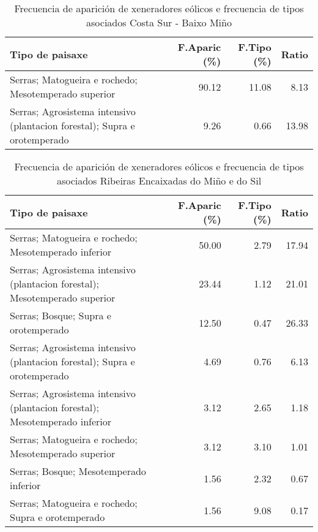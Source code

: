 \begin{table}[p]
\centering
\caption{Frecuencia de aparición de xeneradores eólicos e frecuencia de tipos asociados Costa Sur - Baixo Miño} 
\label{veolico3}
\begin{tabular}{lrrr}
  \hline
Tipo de paisaxe & F.Aparic (\%) & F.Tipo (\%) & Ratio \\ 
  \hline
Serras; Matogueira e rochedo; Mesotemperado superior & 90.12 & 11.08 & 8.13 \\ 
  Serras; Agrosistema intensivo (plantacion forestal); Supra e orotemperado & 9.26 & 0.66 & 13.98 \\ 
   \hline
\end{tabular}
\end{table}
\begin{table}[p]
\centering
\caption{Frecuencia de aparición de xeneradores eólicos e frecuencia de tipos asociados Ribeiras Encaixadas do Miño e do Sil} 
\label{veolico4}
\begin{tabular}{lrrr}
  \hline
Tipo de paisaxe & F.Aparic (\%) & F.Tipo (\%) & Ratio \\ 
  \hline
Serras; Matogueira e rochedo; Mesotemperado inferior & 50.00 & 2.79 & 17.94 \\ 
  Serras; Agrosistema intensivo (plantacion forestal); Mesotemperado superior & 23.44 & 1.12 & 21.01 \\ 
  Serras; Bosque; Supra e orotemperado & 12.50 & 0.47 & 26.33 \\ 
  Serras; Agrosistema intensivo (plantacion forestal); Supra e orotemperado & 4.69 & 0.76 & 6.13 \\ 
  Serras; Agrosistema intensivo (plantacion forestal); Mesotemperado inferior & 3.12 & 2.65 & 1.18 \\ 
  Serras; Matogueira e rochedo; Mesotemperado superior & 3.12 & 3.10 & 1.01 \\ 
  Serras; Bosque; Mesotemperado inferior & 1.56 & 2.32 & 0.67 \\ 
  Serras; Matogueira e rochedo; Supra e orotemperado & 1.56 & 9.08 & 0.17 \\ 
   \hline
\end{tabular}
\end{table}
